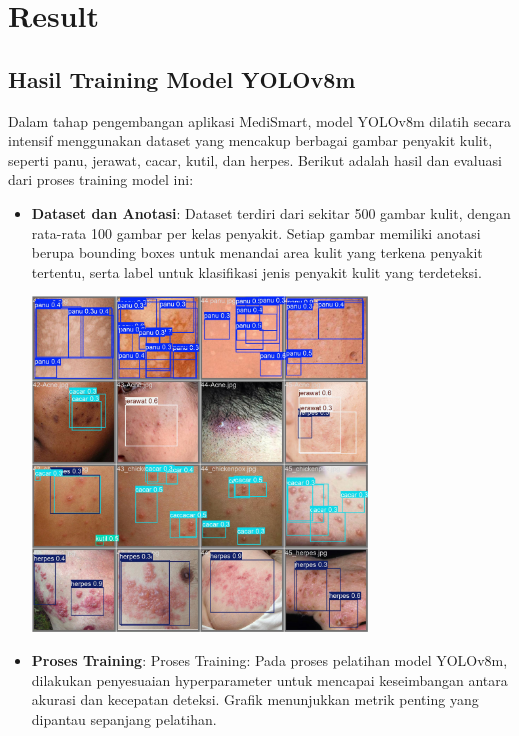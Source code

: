 \documentclass[journal,article,submit,pdftex,moreauthors]{Definitions/mdpi}
\begin{document}
\section{ Result}

\subsection{Hasil Training Model YOLOv8m}
Dalam tahap pengembangan aplikasi MediSmart, model YOLOv8m dilatih secara intensif menggunakan dataset yang mencakup berbagai gambar penyakit kulit, seperti panu, jerawat, cacar, kutil, dan herpes. Berikut adalah hasil dan evaluasi dari proses training model ini:

\begin{itemize}
    \item \textbf{Dataset dan Anotasi}: Dataset terdiri dari sekitar 500 gambar kulit, dengan rata-rata 100 gambar per kelas penyakit. Setiap gambar memiliki anotasi berupa bounding boxes untuk menandai area kulit yang terkena penyakit tertentu, serta label untuk klasifikasi jenis penyakit kulit yang terdeteksi.

    \hspace{4em}
    \includegraphics[width=0.7\textwidth]{images/val_batch1_pred.jpg}
    \vspace{10pt}
    \vspace{-15pt}
            \captionsetup{justification=centering, margin=140pt}

    \vspace{15pt}
    \item \textbf{Proses Training}: Proses Training: Pada proses pelatihan model YOLOv8m, dilakukan penyesuaian hyperparameter untuk mencapai keseimbangan antara akurasi dan kecepatan deteksi. Grafik menunjukkan metrik penting yang dipantau sepanjang pelatihan.


\end{itemize}
\end{document}
